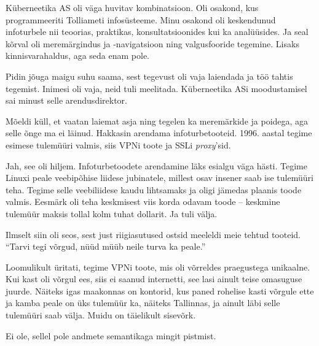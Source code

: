 Küberneetika AS oli väga 
huvitav kombinatsioon. Oli osakond, kus programmeeriti Tolliameti 
infosüsteeme. Minu osakond oli keskendunud infoturbele nii teoorias, 
praktikas, konsultatsioonides kui ka analüüsides. Ja seal kõrval oli 
meremärgindus ja -navigatsioon ning valgusfooride tegemine. Lisaks
kinnisvarahaldus, aga seda enam pole. 
 

Pidin jõuga maigu suhu saama, sest tegevust oli vaja laiendada ja 
töö tahtis tegemist. Inimesi oli vaja, neid tuli meelitada. 
Küberneetika ASi moodustamisel sai minust selle
arendusdirektor. 

Mõeldi küll, et vaatan laiemat asja ning tegelen ka meremärkide 
ja poidega, aga selle õnge ma ei läinud. Hakkasin arendama infoturbetooteid. 1996. aastal tegime esimese tulemüüri valmis, siis 
VPNi toote ja SSLi \emph{proxy}'sid. 


Jah, see oli hiljem. Infoturbetoodete arendamine läks esialgu väga
hästi. Tegime Linuxi peale veebipõhise liidese 
jubinatele, millest osav insener saab ise tulemüüri teha. Tegime selle veebiliidese kaudu lihtsamaks ja oligi jämedas plaanis 
toode valmis. Eesmärk oli teha keskmisest viis korda odavam toode – keskmine 
tulemüür maksis tollal kolm tuhat dollarit. Ja tuli välja. 

Ilmselt siin oli seos, sest just 
riigiasutused ostsid meeleldi meie tehtud tooteid. \enquote{Tarvi 
tegi võrgud, nüüd müüb neile turva ka peale.}


Loomulikult üritati, tegime 
VPNi toote, mis oli võrreldes praegustega unikaalne. Kui kast 
oli võrgul ees, siis ei saanud internetti, see lasi ainult teise omasuguse juurde. 
Näiteks igas maakonnas on kontorid, kus paned rohelise kasti võrgule ette ja kamba peale on üks tulemüür ka, näiteks Tallinnas, ja ainult läbi selle tulemüüri saab 
välja. Muidu on täielikult sisevõrk. 


Ei ole, sellel pole andmete semantikaga mingit pistmist. 

